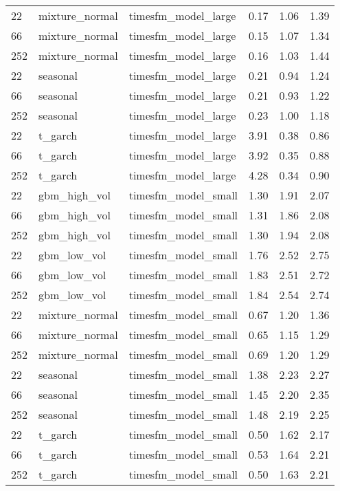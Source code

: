 {\begin{tabular}{lllrrr}
\midrule
22 & mixture\_normal & timesfm\_model\_large & 0.17 & 1.06 & 1.39 \\
66 & mixture\_normal & timesfm\_model\_large & 0.15 & 1.07 & 1.34 \\
252 & mixture\_normal & timesfm\_model\_large & 0.16 & 1.03 & 1.44 \\
\midrule
22 & seasonal & timesfm\_model\_large & 0.21 & 0.94 & 1.24 \\
66 & seasonal & timesfm\_model\_large & 0.21 & 0.93 & 1.22 \\
252 & seasonal & timesfm\_model\_large & 0.23 & 1.00 & 1.18 \\
\midrule
22 & t\_garch & timesfm\_model\_large & 3.91 & 0.38 & 0.86 \\
66 & t\_garch & timesfm\_model\_large & 3.92 & 0.35 & 0.88 \\
252 & t\_garch & timesfm\_model\_large & 4.28 & 0.34 & 0.90 \\
\midrule
22 & gbm\_high\_vol & timesfm\_model\_small & 1.30 & 1.91 & 2.07 \\
66 & gbm\_high\_vol & timesfm\_model\_small & 1.31 & 1.86 & 2.08 \\
252 & gbm\_high\_vol & timesfm\_model\_small & 1.30 & 1.94 & 2.08 \\
\midrule
22 & gbm\_low\_vol & timesfm\_model\_small & 1.76 & 2.52 & 2.75 \\
66 & gbm\_low\_vol & timesfm\_model\_small & 1.83 & 2.51 & 2.72 \\
252 & gbm\_low\_vol & timesfm\_model\_small & 1.84 & 2.54 & 2.74 \\
\midrule
22 & mixture\_normal & timesfm\_model\_small & 0.67 & 1.20 & 1.36 \\
66 & mixture\_normal & timesfm\_model\_small & 0.65 & 1.15 & 1.29 \\
252 & mixture\_normal & timesfm\_model\_small & 0.69 & 1.20 & 1.29 \\
\midrule
22 & seasonal & timesfm\_model\_small & 1.38 & 2.23 & 2.27 \\
66 & seasonal & timesfm\_model\_small & 1.45 & 2.20 & 2.35 \\
252 & seasonal & timesfm\_model\_small & 1.48 & 2.19 & 2.25 \\
\midrule
22 & t\_garch & timesfm\_model\_small & 0.50 & 1.62 & 2.17 \\
66 & t\_garch & timesfm\_model\_small & 0.53 & 1.64 & 2.21 \\
252 & t\_garch & timesfm\_model\_small & 0.50 & 1.63 & 2.21 \\

\end{tabular}}
